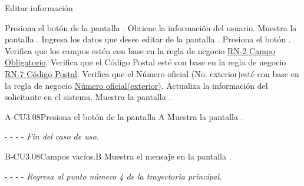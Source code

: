 	\begin{UCtrayectoria}{Editar información }

        \UCpaso[\UCactor]Presiona el botón  de la pantalla .
        \UCpaso[\UCsist] Obtiene la información del usuario.
		\UCpaso[\UCsist] Muestra la pantalla . 
		\UCpaso[\UCactor] Ingresa los datos que desee editar de la pantalla .
		\UCpaso[\UCactor] Presiona el botón . %
		\UCpaso[\UCsist] Verifica que los campos estén con base en la regla de negocio \hyperlink{RN2}{RN-2 Campo Obligatorio}. 
		\UCpaso[\UCsist] Verifica que el Código Postal esté con base en la regla de negocio \hyperlink{RN7}{RN-7 C\'odigo Postal}. 
		\UCpaso[\UCsist] Verifica que el Número oficial (No. exterior)esté con base en la regla de negocio \hyperlink{RN12}{Número oficial(exterior)}. 
        \UCpaso[\UCsist] Actualiza la información del solicitante en el sistema.
	    \UCpaso[\UCsist] Muestra la pantalla .
	
	\end{UCtrayectoria}
	


	

	
	

	\begin{UCtrayectoriaA}{A-CU3.08}{Presiona el botón  de la pantalla }{A}
		\UCpaso[\UCsist] Muestra la pantalla .
		\item[- -] - - {\em Fin del caso de uso.} 
	\end{UCtrayectoriaA}

	\begin{UCtrayectoriaA}{B-CU3.08}{Campos vacíos.}{B}
	    \UCpaso[\UCsist]Muestra el mensaje en la pantalla .
	    \item[- -] - - {\em Regresa al punto número 4 de la trayectoria principal.}
	\end{UCtrayectoriaA}
	
